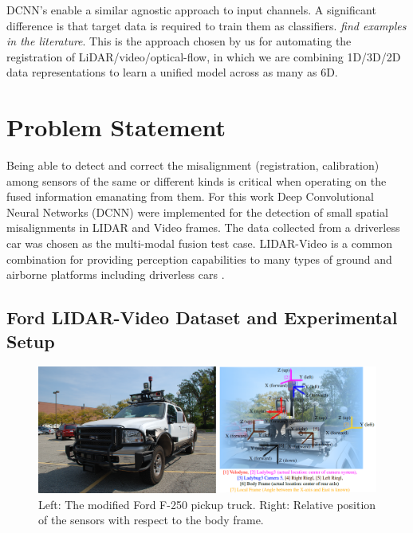\documentclass{article}
\begin{document}
DCNN's enable a similar agnostic approach to input channels. A significant difference is that target data is required to train them as classifiers. \emph{find examples in the literature}. This is the approach chosen by us for automating the registration of LiDAR/video/optical-flow, in which we are combining 1D/3D/2D data representations to learn a unified model across as many as 6D. 




\section{Problem Statement} %
\label{sec:problem_statement}

Being able to detect and correct the misalignment (registration, calibration) among sensors of the same or different kinds is critical when operating on the fused information emanating from them. For this work Deep Convolutional Neural Networks (DCNN) were implemented for the detection of small spatial misalignments in LIDAR and Video frames. The data collected from a driverless car was chosen as the multi-modal fusion test case. LIDAR-Video is a common combination for providing perception capabilities to many types of ground and airborne platforms including driverless cars \cite{Thrun2011Googles-dr}. 

\subsection{Ford LIDAR-Video Dataset and Experimental Setup} %
\label{sub:ford_lidar_video_dataset_and_experimental_setup}

\begin{figure}[htbp]
    \centering
        \includegraphics[scale=0.45]{Figures/ford-truck-sensors.png}
    \caption{Left: The modified Ford F-250 pickup truck. Right: Relative position of the sensors with respect to the body frame.}
    \label{fig:ford-truck-sensors}
\end{figure}
\end{document}
